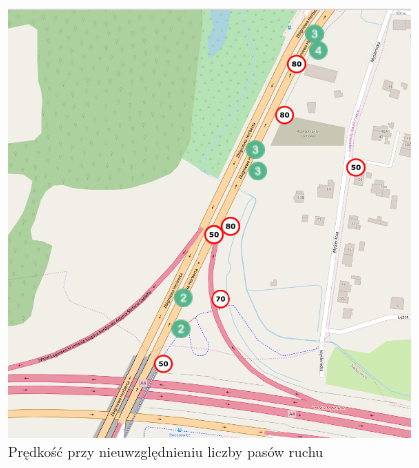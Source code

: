 \begin{figure}[h]
\caption{Prędkość przy nieuwzględnieniu liczby pasów ruchu}
\label{sec:laneNumber}
\centering
\includegraphics[width=0.95\textwidth]{laneNumber}
\end{figure}

